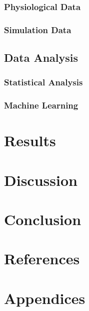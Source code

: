 \documentclass[12pt]{article}
\begin{document}
\subsubsection{Physiological Data}

\subsubsection{Simulation Data}

\subsection{Data Analysis}

\subsubsection{Statistical Analysis}

\subsubsection{Machine Learning}

\section{Results}

\section{Discussion}



\section{Conclusion}

\section{References}




\section{Appendices}
\end{document}
